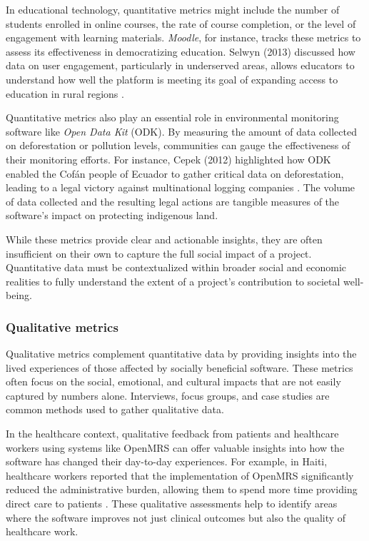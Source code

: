 \begin{refsection}
In educational technology, quantitative metrics might include the number of students enrolled in online courses, the rate of course completion, or the level of engagement with learning materials. \textit{Moodle}, for instance, tracks these metrics to assess its effectiveness in democratizing education. Selwyn (2013) discussed how data on user engagement, particularly in underserved areas, allows educators to understand how well the platform is meeting its goal of expanding access to education in rural regions \cite[pp.~93-95]{selwyn2013}. 

Quantitative metrics also play an essential role in environmental monitoring software like \textit{Open Data Kit} (ODK). By measuring the amount of data collected on deforestation or pollution levels, communities can gauge the effectiveness of their monitoring efforts. For instance, Cepek (2012) highlighted how ODK enabled the Cofán people of Ecuador to gather critical data on deforestation, leading to a legal victory against multinational logging companies \cite[pp.~47-49]{cepek2012}. The volume of data collected and the resulting legal actions are tangible measures of the software's impact on protecting indigenous land.

While these metrics provide clear and actionable insights, they are often insufficient on their own to capture the full social impact of a project. Quantitative data must be contextualized within broader social and economic realities to fully understand the extent of a project’s contribution to societal well-being.

\subsubsection{Qualitative metrics}

Qualitative metrics complement quantitative data by providing insights into the lived experiences of those affected by socially beneficial software. These metrics often focus on the social, emotional, and cultural impacts that are not easily captured by numbers alone. Interviews, focus groups, and case studies are common methods used to gather qualitative data.

In the healthcare context, qualitative feedback from patients and healthcare workers using systems like OpenMRS can offer valuable insights into how the software has changed their day-to-day experiences. For example, in Haiti, healthcare workers reported that the implementation of OpenMRS significantly reduced the administrative burden, allowing them to spend more time providing direct care to patients \cite[pp.~259-261]{farmer2010}. These qualitative assessments help to identify areas where the software improves not just clinical outcomes but also the quality of healthcare work.


\end{refsection}

